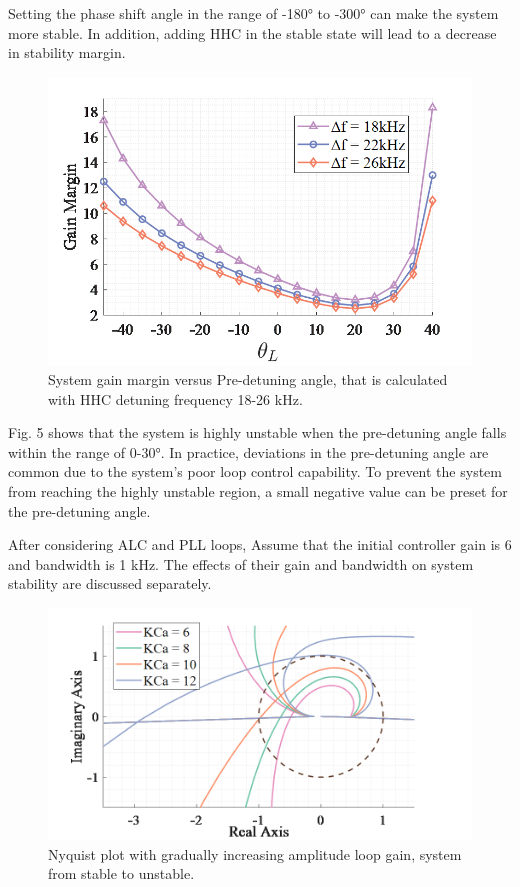 \documentclass[letterpaper,
               nospread,     %
               ]{jacow}
\begin{document}
Setting the phase shift angle in the range of -180° to -300° can make the system more stable. In addition, adding HHC in the stable state will lead to a decrease in stability margin.
\begin{figure}[!htb]
   \centering
   \includegraphics*[width=0.7\columnwidth]{THPA037_f5}
   \caption{System gain margin versus Pre-detuning angle, that is calculated with HHC detuning frequency 18-26 kHz.}
   \label{fig:paper_layout}
\end{figure}

Fig. 5 shows that the system is highly unstable when the pre-detuning angle falls within the range of 0-30°. In practice, deviations in the pre-detuning angle are common due to the system's poor loop control capability. To prevent the system from reaching the highly unstable region, a small negative value can be preset for the pre-detuning angle.

After considering ALC and PLL loops, Assume that the initial controller gain is 6 and bandwidth is 1 kHz. The effects of their gain and bandwidth on system stability are discussed separately\cite{ref14}.
\begin{figure}[!htb]
   \centering
   \includegraphics*[width=0.8\columnwidth]{THPA037_f6}
   \caption{Nyquist plot with gradually increasing amplitude loop gain, system from stable to unstable.}
   \label{fig:paper_layout}
\end{figure}
\end{document}

